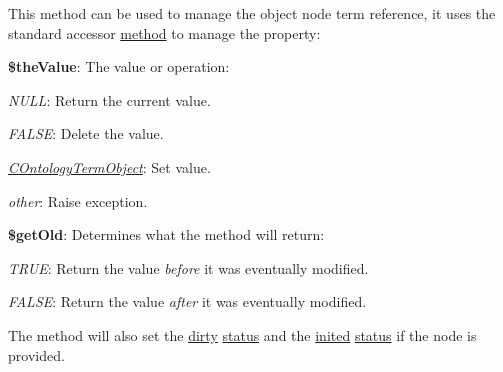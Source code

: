 This method can be used to manage the object node term reference, it uses the standard accessor \hyperlink{class_c_object_a9b8dccdadcf4fea58f915bd9b228e23e}{method} to manage the property\-:


\begin{DoxyItemize}
\item {\bfseries \$the\-Value}\-: The value or operation\-: 
\begin{DoxyItemize}
\item {\itshape N\-U\-L\-L}\-: Return the current value. 
\item {\itshape F\-A\-L\-S\-E}\-: Delete the value. 
\item {\itshape \hyperlink{class_c_ontology_term_object}{C\-Ontology\-Term\-Object}}\-: Set value. 
\item {\itshape other}\-: Raise exception. 
\end{DoxyItemize}
\item {\bfseries \$get\-Old}\-: Determines what the method will return\-: 
\begin{DoxyItemize}
\item {\itshape T\-R\-U\-E}\-: Return the value {\itshape before} it was eventually modified. 
\item {\itshape F\-A\-L\-S\-E}\-: Return the value {\itshape after} it was eventually modified. 
\end{DoxyItemize}
\end{DoxyItemize}

The method will also set the \hyperlink{class_c_status_object_a19c4ac94dfe26476e780d77b99744d43}{dirty} \hyperlink{}{status} and the \hyperlink{class_c_status_object_a8429102e4f52f7558649b64f4e673a69}{inited} \hyperlink{}{status} if the node is provided.



